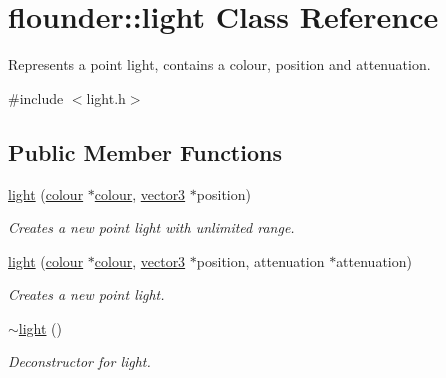 \hypertarget{classflounder_1_1light}{}\section{flounder\+:\+:light Class Reference}
\label{classflounder_1_1light}


Represents a point light, contains a colour, position and attenuation.  




{\ttfamily \#include $<$light.\+h$>$}

\subsection*{Public Member Functions}
\begin{DoxyCompactItemize}
\item 
\hyperlink{classflounder_1_1light_a14ba36b32493ab4e40800f7146d90f00}{light} (\hyperlink{classflounder_1_1colour}{colour} $\ast$\hyperlink{classflounder_1_1colour}{colour}, \hyperlink{classflounder_1_1vector3}{vector3} $\ast$position)
\begin{DoxyCompactList}\small\item\em Creates a new point light with unlimited range. \end{DoxyCompactList}\item 
\hyperlink{classflounder_1_1light_a709ddf76cdafd5b95ff5f032a17eb76f}{light} (\hyperlink{classflounder_1_1colour}{colour} $\ast$\hyperlink{classflounder_1_1colour}{colour}, \hyperlink{classflounder_1_1vector3}{vector3} $\ast$position, attenuation $\ast$attenuation)
\begin{DoxyCompactList}\small\item\em Creates a new point light. \end{DoxyCompactList}\item 
\hyperlink{classflounder_1_1light_a352cc02167e091a1c05d560d96ca3636}{$\sim$light} ()
\begin{DoxyCompactList}\small\item\em Deconstructor for light. \end{DoxyCompactList}\end{DoxyCompactItemize}
